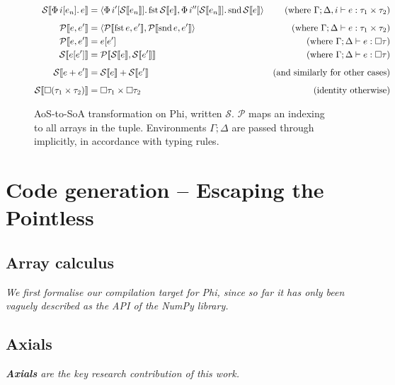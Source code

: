 \begin{figure}[h]
    \centering
    \begin{align*}
\phisoa {\phivec{i}{e_n}{e}}
&= \phipair{\phivec{i'}{\phisoa{e_n}}{\phifst{\phisoa{e}}}}{\phivec{i''}{\phisoa{e_n}}{\phisnd{\phisoa{e}}}}
&\text{(where }\Gamma; \Delta, i \vdash e : \phipairtype{\tau_1}{\tau_2} \text{)} \\[0.5em]
\phitupleindex{e}{e'}
&= \phipair{\phitupleindex{\phifst{e}}{e'}}{\phitupleindex{\phisnd{e}}{e'}}
&\text{(where }\Gamma; \Delta \vdash e : \phipairtype{\tau_1}{\tau_2} \text{)} \\
\phitupleindex{e}{e'}
&= e\left[ e' \right]
&\text{(where }\Gamma; \Delta \vdash e : \phivectype{\tau} \text{)} \\
\phisoa{e[e']}
&= \phitupleindex{\phisoa{e}}{\phisoa{e'}}
&\text{(where }\Gamma; \Delta \vdash e : \phivectype{\tau} \text{)} \\[0.5em]
\phisoa{e + e'}
&= \phisoa{e} + \phisoa{e'}
&\text{(and similarly for other cases)} \\[0.5em]
\phisoa{\phivectype{(\phipairtype{\tau_1}{\tau_2}})} &= \phipairtype{\phivectype{\tau_1}}{\phivectype{\tau_2}} &\text{(identity otherwise)}
    \end{align*}
    \caption{AoS-to-SoA transformation on Phi, written $\mathcal S$. $\mathcal P$ maps an indexing to all arrays in the tuple. Environments $\Gamma; \Delta$ are passed through implicitly, in accordance with typing rules.}
    \label{fig:aos-to-soa}
\end{figure}

\section{Code generation -- Escaping the Pointless}

\subsection{Array calculus}

\textit{We first formalise our compilation target for Phi, since so far it has only been vaguely described as the API of the NumPy library.} \todothis

\subsection{Axials}

\textit{\textbf{Axials} are the key research contribution of this work.}

